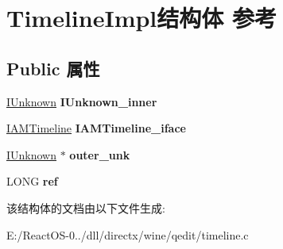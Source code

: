 \hypertarget{struct_timeline_impl}{}\section{Timeline\+Impl结构体 参考}
\label{struct_timeline_impl}
\subsection*{Public 属性}
\begin{DoxyCompactItemize}
\item 
\mbox{\label{struct_timeline_impl_a3aa18504ebdc2450ba54e3c08639c180}} 
\hyperlink{interface_i_unknown}{I\+Unknown} {\bfseries I\+Unknown\+\_\+inner}
\item 
\mbox{\label{struct_timeline_impl_a36e717139f2c0bee8f4ead8df2db812a}} 
\hyperlink{interface_i_a_m_timeline}{I\+A\+M\+Timeline} {\bfseries I\+A\+M\+Timeline\+\_\+iface}
\item 
\mbox{\label{struct_timeline_impl_a1511d42b8b1568c30a7142b2e80c2502}} 
\hyperlink{interface_i_unknown}{I\+Unknown} $\ast$ {\bfseries outer\+\_\+unk}
\item 
\mbox{\label{struct_timeline_impl_a4cd79f2c5e0131ce8be64460450f5ba7}} 
L\+O\+NG {\bfseries ref}
\end{DoxyCompactItemize}


该结构体的文档由以下文件生成\+:\begin{DoxyCompactItemize}
\item 
E\+:/\+React\+O\+S-\/0../dll/directx/wine/qedit/timeline.\+c\end{DoxyCompactItemize}
